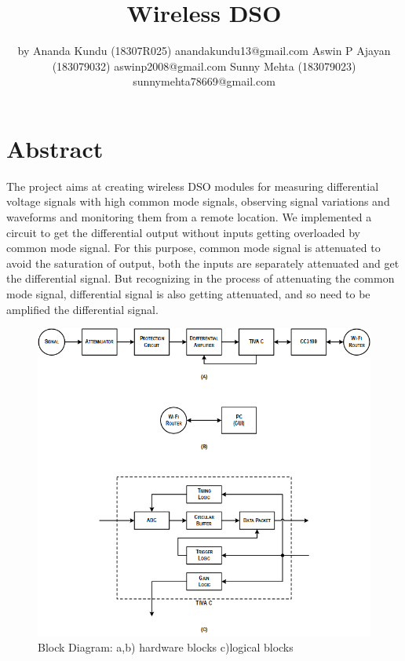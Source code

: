 \documentclass{article}
\begin{document}
	\author{by \endline Ananda Kundu	(18307R025)	 anandakundu13@gmail.com 
		\endline Aswin P Ajayan	(183079032) 	aswinp2008@gmail.com
		\endline Sunny Mehta	(183079023) 	sunnymehta78669@gmail.com}
	\title{Wireless DSO}
	\maketitle
	
	\section{Abstract}
	The project aims at creating wireless DSO modules for measuring differential voltage
	signals with high common mode signals, observing signal variations and waveforms
	and monitoring them from a remote location.
	We implemented a circuit to get the differential output without inputs getting
	overloaded by common mode signal. For this purpose, common mode signal is
	attenuated to avoid the saturation of output, both the inputs are separately
	attenuated and get the differential signal. But recognizing in the process of
	attenuating the common mode signal, differential signal is also getting attenuated,
	and so need to be amplified the differential signal.
	\begin{figure}
		\centering
		\includegraphics[width=0.7\linewidth]{BlockDiagram}
		\caption{Block Diagram: a,b) hardware blocks c)logical blocks}
		\label{fig:blockdiagram}
	\end{figure}
	
	
\end{document}
